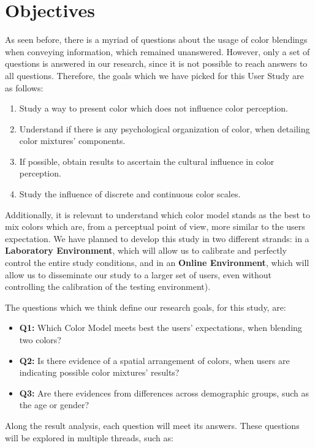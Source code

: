 \section{Objectives}
\label{sec:impl_objectives}
%
As seen before, there is a myriad of questions about the usage of color blendings when conveying information,
which remained unanswered. However, only a set of questions is answered in our research, since it is not possible
to reach answers to all questions. Therefore, the goals which we have picked for this User Study are as follows:
%
\begin{enumerate}
	\item Study a way to present color which does not influence color perception.
  \item Understand if there is any psychological organization of color, when detailing color mixtures' components.
  \item If possible, obtain results to ascertain the cultural influence in color perception.
  \item Study the influence of discrete and continuous color scales.
\end{enumerate}
%
Additionally, it is relevant to understand which color model stands as the best to mix colors which are, from a
perceptual point of view, more similar to the users expectation. We have planned to develop this study in two
different strands: in a \textbf{Laboratory Environment}, which will allow us to calibrate and perfectly control the
entire study conditions, and in an \textbf{Online Environment}, which will allow us to disseminate our study to a
larger set of users, even without controlling the calibration of the testing environment). \par
%
The questions which we think define our research goals, for this study, are:
%
\begin{itemize}
	\item \textbf{Q1:} Which Color Model meets best the users' expectations, when blending two colors?
	\item \textbf{Q2:} Is there evidence of a spatial arrangement of colors, when users are indicating possible color
	mixtures' results?
	\item \textbf{Q3:} Are there evidences from differences across demographic groups, such as the age or gender?
\end{itemize}
%
Along the result analysis, each question will meet its answers. These questions will be explored in multiple
threads, such as:
%
